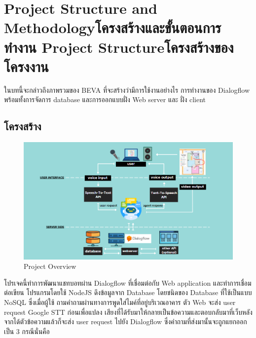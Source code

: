 \chapter{\ifproject%
\ifenglish Project Structure and Methodology\else โครงสร้างและขั้นตอนการทำงาน\fi
\else%
\ifenglish Project Structure\else โครงสร้างของโครงงาน\fi
\fi
}

ในบทนี้จะกล่าวถึงภาพรวมของ BEVA ที่จะสร้างว่ามีการใช้งานอย่างไร 
การทำงานของ Dialogflow พร้อมทั้งการจัดการ database และการออกแบบฝั่ง Web server และ ฝั่ง client

\makeatletter


\makeatother

\section{โครงสร้าง}
  \begin{figure}[hbt!]
    \begin{center}
    \includegraphics[width=\textwidth,keepaspectratio]{pic/overview.png}
    \end{center}
    \caption{Project Overview}
    \label{fig:overview}
  \end{figure}
โปรเจคนี้ทำการพัฒนาแชทบอทผ่าน Dialogflow ที่เชื่อมต่อกับ Web application และทำการเชื่อมต่อเขียน
โปรแกรมโดยใช้ NodeJS ดึงข้อมูลจาก Database โดยชนิดของ Database ที่ใช้เป็นแบบ NoSQL ซึ่งเมื่อผู้ใช้
ถามคำถามผ่านทางการพูดใส่ไมค์ที่อยู่บริเวณอาคาร ตัว Web จะส่ง user request Google STT ก่อนเพื่อแปลง
เสียงที่ได้รับมาให้กลายเป็นข้อความและตอบกลับมาที่เว็บหลังจากได้ตัวข้อความแล้วก็จะส่ง user request ไปยัง
Dialogflow ซึ่งคำถามที่ส่งมานั้นจะถูกแยกออกเป็น 3 กรณีนั่นคือ

